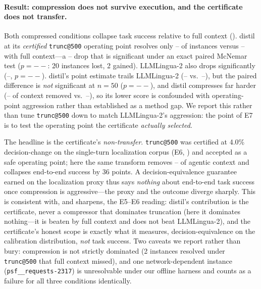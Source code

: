 \documentclass[11pt]{article}
\newcommand{\sweEsevenN}{50}\newcommand{\sweEsevenSeed}{1729}%
\newcommand{\sweEsevenFullPass}{--}\newcommand{\sweEsevenFullResolved}{--}%
\newcommand{\sweEsevenDistilPass}{--}\newcommand{\sweEsevenDistilResolved}{--}%
\newcommand{\sweEsevenDistilCtxRed}{--}\newcommand{\sweEsevenDistilDelta}{--}%
\newcommand{\sweEsevenLinguaPass}{--}\newcommand{\sweEsevenLinguaResolved}{--}%
\newcommand{\sweEsevenLinguaCtxRed}{--}\newcommand{\sweEsevenLinguaDelta}{--}%
\newcommand{\sweEsevenDistilVsFullP}{--}\newcommand{\sweEsevenLinguaVsFullP}{--}%
\newcommand{\sweEsevenDistilVsLinguaP}{--}%
\begin{document}
\paragraph{Result: compression does not survive execution, and the certificate does not
transfer.} Both compressed conditions collapse task success relative to full context
(). distil at its \emph{certified} \texttt{trunc@500} operating point
resolves only \sweEsevenDistilPass{} of instances versus \sweEsevenFullPass{} with full
context---a \sweEsevenDistilDelta{} drop that is significant under an exact paired
McNemar test ($p=\sweEsevenDistilVsFullP{}$: 20 instances lost, 2 gained). LLMLingua-2
also drops significantly (\sweEsevenLinguaPass{}, $p=\sweEsevenLinguaVsFullP{}$). distil's
point estimate trails LLMLingua-2 (\sweEsevenDistilPass{} vs.\ \sweEsevenLinguaPass{}),
but the paired difference is \emph{not} significant at $n=\sweEsevenN{}$
($p=\sweEsevenDistilVsLinguaP{}$), and distil compresses far harder
(\sweEsevenDistilCtxRed{} of context removed vs.\ \sweEsevenLinguaCtxRed{}), so its lower
score is confounded with operating-point aggression rather than established as a method
gap. We report this rather than tune \texttt{trunc@500} down to match LLMLingua-2's
aggression: the point of E7 is to test the operating point the certificate \emph{actually
selected}.

The headline is the certificate's \emph{non-transfer}. \texttt{trunc@500} was certified
at 4.0\% decision-change on the single-turn localization corpus (E6, )
and accepted as a safe operating point; here the same transform removes
\sweEsevenDistilCtxRed{} of agentic context and collapses end-to-end success by 36
points. A decision-equivalence guarantee earned on the localization proxy thus says
\emph{nothing} about end-to-end task success once compression is aggressive---the proxy
and the outcome diverge sharply. This is consistent with, and sharpens, the E5--E6
reading: distil's contribution is the certificate, never a compressor that dominates
truncation (here it dominates nothing---it is beaten by full context and does not beat
LLMLingua-2), and the certificate's honest scope is exactly what it measures,
decision-equivalence on the calibration distribution, \emph{not} task success. Two
caveats we report rather than bury: compression is not strictly dominated (2 instances
resolved under \texttt{trunc@500} that full context missed), and one network-dependent
instance (\texttt{psf\_\_requests-2317}) is unresolvable under our offline harness and
counts as a failure for all three conditions identically.
\end{document}
